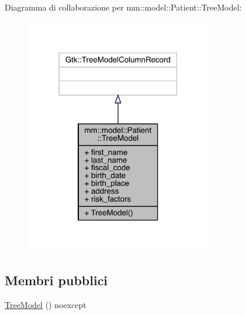 Diagramma di collaborazione per mm\+:\+:model\+:\+:Patient\+:\+:Tree\+Model\+:
\nopagebreak
\begin{figure}[H]
\begin{center}
\leavevmode
\includegraphics[width=231pt]{d6/d84/structmm_1_1model_1_1_patient_1_1_tree_model__coll__graph}
\end{center}
\end{figure}
\subsection*{Membri pubblici}
\begin{DoxyCompactItemize}
\item 
\mbox{\hyperlink{structmm_1_1model_1_1_patient_1_1_tree_model_a53ebc678daee18b03328be60d1c69bf4}{Tree\+Model}} () noexcept
\end{DoxyCompactItemize}
